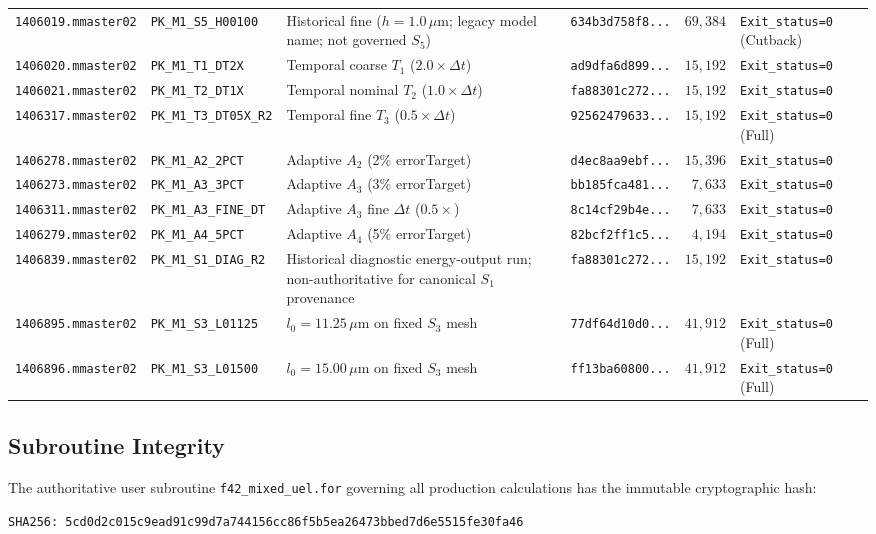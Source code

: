 \begin{table}[htbp]
\begin{tabularx}{\textwidth}{llYlrl}
\texttt{1406019.mmaster02} & \texttt{PK\_M1\_S5\_H00100} & Historical fine ($h=1.0\,\mu\mathrm{m}$; legacy model name; not governed $S_5$) & \texttt{634b3d758f8...} & $69{,}384$ & \texttt{Exit\_status=0} (Cutback) \\
\texttt{1406020.mmaster02} & \texttt{PK\_M1\_T1\_DT2X} & Temporal coarse $T_1$ ($2.0\times\Delta t$) & \texttt{ad9dfa6d899...} & $15{,}192$ & \texttt{Exit\_status=0} \\
\texttt{1406021.mmaster02} & \texttt{PK\_M1\_T2\_DT1X} & Temporal nominal $T_2$ ($1.0\times\Delta t$) & \texttt{fa88301c272...} & $15{,}192$ & \texttt{Exit\_status=0} \\
\texttt{1406317.mmaster02} & \texttt{PK\_M1\_T3\_DT05X\_R2} & Temporal fine $T_3$ ($0.5\times\Delta t$) & \texttt{92562479633...} & $15{,}192$ & \texttt{Exit\_status=0} (Full) \\
\texttt{1406278.mmaster02} & \texttt{PK\_M1\_A2\_2PCT} & Adaptive $A_2$ (2\% errorTarget) & \texttt{d4ec8aa9ebf...} & $15{,}396$ & \texttt{Exit\_status=0} \\
\texttt{1406273.mmaster02} & \texttt{PK\_M1\_A3\_3PCT} & Adaptive $A_3$ (3\% errorTarget) & \texttt{bb185fca481...} & $7{,}633$ & \texttt{Exit\_status=0} \\
\texttt{1406311.mmaster02} & \texttt{PK\_M1\_A3\_FINE\_DT} & Adaptive $A_3$ fine $\Delta t$ ($0.5\times$) & \texttt{8c14cf29b4e...} & $7{,}633$ & \texttt{Exit\_status=0} \\
\texttt{1406279.mmaster02} & \texttt{PK\_M1\_A4\_5PCT} & Adaptive $A_4$ (5\% errorTarget) & \texttt{82bcf2ff1c5...} & $4{,}194$ & \texttt{Exit\_status=0} \\
\texttt{1406839.mmaster02} & \texttt{PK\_M1\_S1\_DIAG\_R2} & Historical diagnostic energy-output run; non-authoritative for canonical $S_1$ provenance & \texttt{fa88301c272...} & $15{,}192$ & \texttt{Exit\_status=0} \\
\texttt{1406895.mmaster02} & \texttt{PK\_M1\_S3\_L01125} & $l_0 = 11.25\,\mu\mathrm{m}$ on fixed $S_3$ mesh & \texttt{77df64d10d0...} & $41{,}912$ & \texttt{Exit\_status=0} (Full) \\
\texttt{1406896.mmaster02} & \texttt{PK\_M1\_S3\_L01500} & $l_0 = 15.00\,\mu\mathrm{m}$ on fixed $S_3$ mesh & \texttt{ff13ba60800...} & $41{,}912$ & \texttt{Exit\_status=0} (Full) \\
\bottomrule
\end{tabularx}
\end{table}

\subsection{Subroutine Integrity}
The authoritative user subroutine \nolinkurl{f42_mixed_uel.for} governing all production calculations has the immutable cryptographic hash:
\begin{center}
  \texttt{SHA256: 5cd0d2c015c9ead91c99d7a744156cc86f5b5ea26473bbed7d6e5515fe30fa46}
\end{center}



